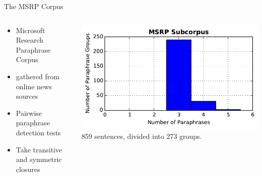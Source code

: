 \documentclass[12pt,landscape,english]{beamer}
\begin{document}
\begin{frame}{The MSRP Corpus}
	\begin{columns}
		\begin{column}{0.5\textwidth}
			\begin{itemize}
				\item Microsoft Research Paraphrase Corpus
				\item gathered from online news sources
				\item Pairwise paraphrase detection tests
				\item Take transitive and symmetric closures
			\end{itemize}
		\end{column}
		\begin{column}{0.5\textwidth}
			\includegraphics[width=\textwidth]{msrp_hist.pdf}\\
			859 sentences, divided into 273 groups.
		\end{column}
	\end{columns}
	\vfill

		
\end{frame}
\end{document}
